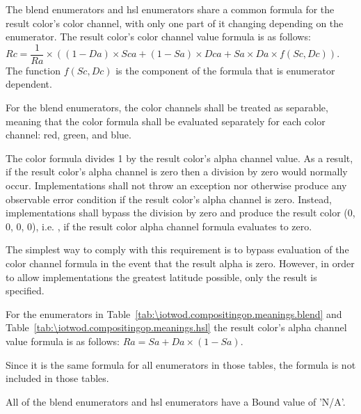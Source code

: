 \pnum
The blend enumerators and hsl enumerators share a common formula for the result 
color's color channel, with only one part of it changing depending on the 
enumerator. The result color's color channel value formula is as follows: $Rc = 
\dfrac{1}{Ra} \times ((1 - Da) \times Sca + (1 - Sa) \times Dca + Sa \times Da 
\times f(Sc, Dc))$. The function $f(Sc, Dc)$ is the component of the formula 
that is enumerator dependent.

\pnum
For the blend enumerators, the color channels shall be treated as separable, 
meaning that the color formula shall be evaluated separately for each color 
channel: red, green, and blue.

\pnum
The color formula divides 1 by the result color's alpha channel value. As a 
result, if the result color's alpha channel is zero then a division by zero 
would normally occur. Implementations shall not throw an exception nor  
otherwise produce any observable error condition if the result color's alpha 
channel is zero. Instead, implementations shall bypass the division by zero and 
produce the result color (0, 0, 0, 0), i.e. , if the result color alpha channel formula 
evaluates to zero.
\begin{note}
The simplest way to comply with this requirement is to bypass evaluation of the 
color channel formula in the event that the result alpha is zero. However, in 
order to allow implementations the greatest latitude possible, only the result 
is specified.
\end{note}

\pnum
For the enumerators in 
Table~\ref{tab:\iotwod.compositingop.meanings.blend} and 
Table~\ref{tab:\iotwod.compositingop.meanings.hsl} the result color's 
alpha channel value formula is as follows: $Ra = Sa + Da \times (1 - Sa)$.
\begin{note}
Since it is the same formula for all enumerators in those tables, the formula 
is not included in those tables.
\end{note}

\pnum
All of the blend enumerators and hsl enumerators have a Bound value of 'N/A'.

